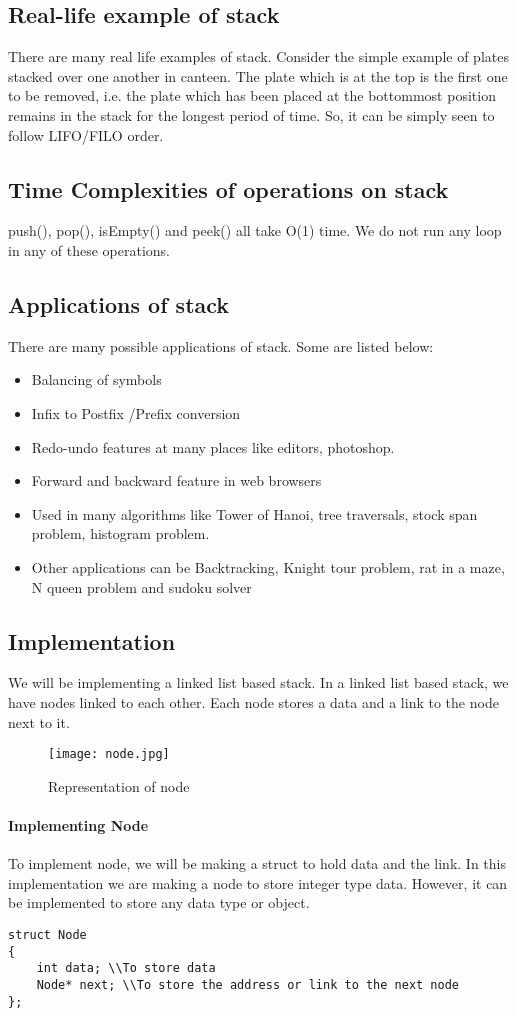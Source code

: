 \documentclass[11pt,fleqn]{book} %
\begin{document}
\subsection{Real-life example of stack}
There are many real life examples of stack. Consider the simple example of plates stacked over one another in canteen. The plate which is at the top is the first one to be removed, i.e. the plate which has been placed at the bottommost position remains in the stack for the longest period of time. So, it can be simply seen to follow LIFO/FILO order.
\subsection{Time Complexities of operations on stack}
push(), pop(), isEmpty() and peek() all take O(1) time. We do not run any loop in any of these operations.

\subsection{Applications of stack}
There are many possible applications of stack. Some are listed below:
\begin{itemize}
	\item Balancing of symbols
	\item Infix to Postfix /Prefix conversion
	\item Redo-undo features at many places like editors, photoshop.
	\item Forward and backward feature in web browsers
	\item Used in many algorithms like Tower of Hanoi, tree traversals, stock span problem, histogram problem.
	\item Other applications can be Backtracking, Knight tour problem, rat in a maze, N queen problem and sudoku solver
\end{itemize}
\subsection{Implementation}
We will be implementing a linked list based stack. In a linked list based stack, we have nodes linked to each other.
Each node stores a data and a link to the node next to it.
\begin{figure}[H]
	\centering
	\texttt{[image: node.jpg]}
	\caption{Representation of node}
\end{figure}
\paragraph{Implementing Node}
To implement node, we will be making a struct to hold data and the link. In this implementation we are making a node to store integer type data. However, it can be implemented to store any data type or object.
\begin{lstlisting}
struct Node
{
	int data; \\To store data
	Node* next; \\To store the address or link to the next node
};
\end{lstlisting}
\newpage
\end{document}
